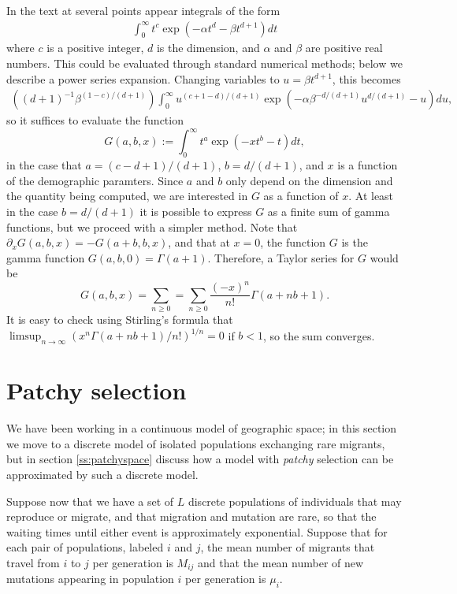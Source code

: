 \documentclass{article}
\begin{document}
In the text at several points appear integrals of the form
\begin{align}
  \int_0^\infty t^c \exp \left( - \alpha t^d - \beta t^{d+1} \right) dt 
\end{align}
where $c$ is a positive integer, $d$ is the dimension, and $\alpha$ and $\beta$ are positive real numbers.
This could be evaluated through standard numerical methods; below we describe a power series expansion.
Changing variables to $u = \beta t^{d+1}$, this becomes
\begin{align}
    \left( (d+1)^{-1} \beta^{ (1-c)/(d+1) } \right) \int_0^\infty u^{(c+1-d)/(d+1)} \exp\left( - \alpha \beta^{-d/(d+1)} u^{d/(d+1)} - u \right) du ,
\end{align}
so it suffices to evaluate the function
\begin{equation}
    G(a,b,x) := \int_0^\infty  t^a \exp\left( -x t^b - t \right) dt ,
\end{equation}
in the case that $a=(c-d+1)/(d+1)$, $b=d/(d+1)$, and $x$ is a function of the demographic paramters.
Since $a$ and $b$ only depend on the dimension and the quantity being computed,
we are interested in $G$ as a function of $x$.
At least in the case $b=d/(d+1)$ it is possible to express $G$ as a finite sum of gamma functions,
but we proceed with a simpler method.
Note that $\partial_x G(a,b,x) = -G(a+b,b,x)$,
and that at $x=0$, the function $G$ is the gamma function $G(a,b,0) = \Gamma(a+1)$.
Therefore, a Taylor series for $G$ would be
\[
    G(a,b,x) = \sum_{n \ge 0} = \sum_{n \ge 0} \frac{(-x)^n}{n!} \Gamma(a+nb+1) .
\]
It is easy to check using Stirling's formula that $\limsup_{n \to \infty} ( x^n \Gamma(a+nb+1)/n! )^{1/n} = 0$
if $b<1$, so the sum converges.


\section{Patchy selection} 
\label{ss:discretedemes}

We have been working in a continuous model of geographic space; 
in this section we move to a discrete model of isolated populations exchanging rare migrants,
but in section \ref{ss:patchyspace} discuss how a model with {\em patchy} selection can be approximated by such a discrete model.

Suppose now that we have a set of $L$ discrete populations of individuals that may reproduce or migrate,
and that migration and mutation are rare, so that the waiting times until either event is approximately exponential.
Suppose that for each pair of populations, labeled $i$ and $j$, the mean number of migrants that travel from $i$ to $j$ per generation
is $M_{ij}$ and that the mean number of new mutations appearing in population $i$ per generation is $\mu_i$.
\end{document}
